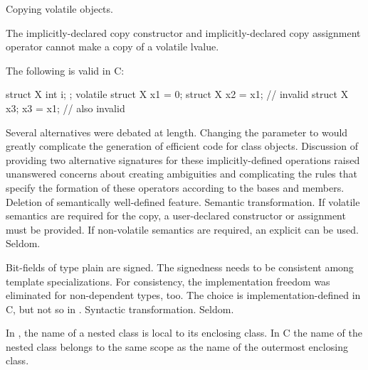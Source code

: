 \change
Copying volatile objects.

The implicitly-declared copy constructor and
implicitly-declared copy assignment operator
cannot make a copy of a volatile lvalue.
\begin{example}
The following is valid in C:
\begin{codeblock}
struct X { int i; };
volatile struct X x1 = {0};
struct X x2 = x1;               // invalid \Cpp{}
struct X x3;
x3 = x1;                        // also invalid \Cpp{}
\end{codeblock}
\end{example}

\rationale
Several alternatives were debated at length.
Changing the parameter to
would greatly complicate the generation of
efficient code for class objects.
Discussion of
providing two alternative signatures for these
implicitly-defined operations raised
unanswered concerns about creating
ambiguities and complicating
the rules that specify the formation of
these operators according to the bases and
members.
\effect
Deletion of semantically well-defined feature.
\difficulty
Semantic transformation.
If volatile semantics are required for the copy,
a user-declared constructor or assignment must
be provided.
If non-volatile semantics are required,
an explicit
can be used.
\howwide
Seldom.

\change
{}%
Bit-fields of type plain  are signed.
\rationale
The signedness needs to be consistent among template specializations.
For consistency,
the implementation freedom was eliminated for non-dependent types,
too.
\effect
The choice is implementation-defined in C, but not so in \Cpp{}.
\difficulty
Syntactic transformation.
\howwide
Seldom.

\change
In \Cpp{}, the name of a nested class is local to its enclosing class. In C
the name of the nested class belongs to the same scope as the name of the outermost enclosing class.

